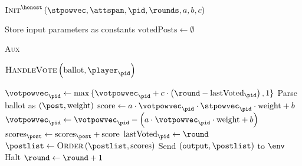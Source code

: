     \begin{algorithm}[H]
      \caption{$\textsc{Init}^{\honest}\left(\stpowvec, \attspan, \pid,
      \rounds, a, b, c\right)$}
      \label{alg:steem:init:honest}
      \begin{algorithmic}[1]
        \State Store input parameters as constants
        \State $\mathrm{votedPosts} \gets \emptyset$
      \end{algorithmic}
    \end{algorithm}

    \begin{algorithm}[H]
      \caption{\textsc{Aux}}
      \label{alg:steem:aux}
      \begin{algorithmic}[1]
        \State \Return {}
      \end{algorithmic}
    \end{algorithm}

    \begin{algorithm}[H]
      \caption{$\textsc{HandleVote}\left(\mathrm{ballot},
      \player_{\pid}\right)$}
      \label{alg:steem:handlevote}
      \begin{algorithmic}[1]
         
          \State $\votpowvec_{\pid} \gets \max{\lbrace \votpowvec_{\pid} + c
          \cdot \left(\round - \mathrm{lastVoted}_{\pid}\right), 1 \rbrace}$
            \State Parse ballot as $\left(\post, \mathrm{weight}\right)$
            \State $\mathrm{score} \gets a \cdot \votpowvec_{\pid} \cdot
            \stpowvec_{\pid} \cdot \mathrm{weight} + b$
            \State $\votpowvec_{\pid} \gets \votpowvec_{\pid} - \left(a \cdot
            \votpowvec_{\pid} \cdot \mathrm{weight} + b\right)$
            \State $\mathrm{scores}_\post \gets \mathrm{scores}_\post +
            \mathrm{score}$
          \EndIf
          \State $\mathrm{lastVoted}_{\pid} \gets \round$
        \EndIf
          \State $\postlist \gets \textsc{Order}\left(\postlist,
          \mathrm{scores}\right)$ 
          \If{$\round = \rounds$}
            \State Send $\left(\mathtt{output}, \postlist\right)$ to $\env$
            \State Halt
          \Else
            \State $\round \gets \round + 1$
          \EndIf
        \EndIf
      \end{algorithmic}
    \end{algorithm}

